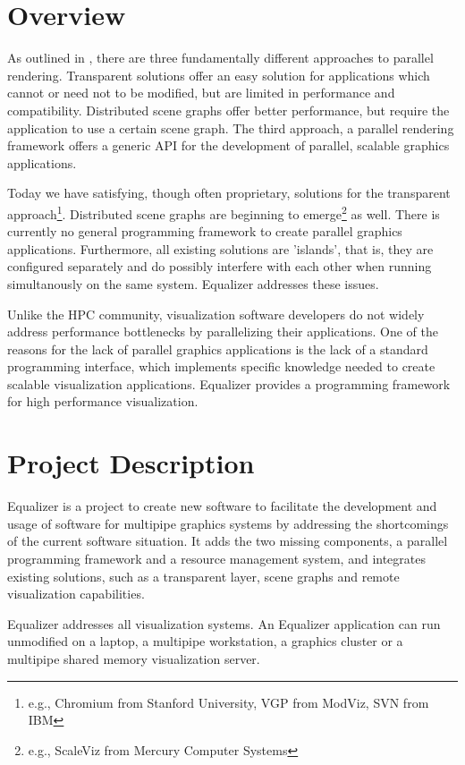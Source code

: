 \documentclass[10pt,a4paper]{scrartcl}
\begin{document}
\section{Overview}
As outlined in \cite{Analysis}, there are three fundamentally different
approaches to parallel rendering. Transparent solutions offer an easy
solution for applications which cannot or need not to be modified, but
are limited in performance and compatibility. Distributed
scene graphs offer better performance, but require the application
to use a certain scene graph. The third approach, a parallel rendering
framework offers a generic API for the development of parallel, scalable
graphics applications.

Today we have satisfying, though often proprietary, solutions for the
transparent approach\footnote{e.g., Chromium from Stanford University,
VGP from ModViz, SVN from IBM}. Distributed scene graphs are beginning
to emerge\footnote{e.g., ScaleViz from Mercury Computer Systems} as
well. There is currently no general programming framework to create
parallel graphics applications. Furthermore, all existing solutions are
'islands', that is, they are configured separately and do possibly
interfere with each other when running simultanously on the same
system. Equalizer addresses these issues.

Unlike the HPC community, visualization software developers do not
widely address performance bottlenecks by parallelizing
their applications. One of the reasons for the lack of parallel graphics
applications is the lack of a standard programming interface, which
implements specific knowledge needed to create scalable visualization
applications. Equalizer provides a programming framework for high
performance visualization.

\section{Project Description}

Equalizer is a project to create new software to facilitate the
development and usage of software for multipipe
graphics systems by addressing the shortcomings of the current
software situation. It adds the two missing components, a
parallel programming framework and a resource management system, and
integrates existing solutions, such as a transparent layer, scene graphs
and remote visualization capabilities.

Equalizer addresses all visualization systems. An Equalizer application
can run unmodified on a laptop, a multipipe workstation, a graphics
cluster or a multipipe shared memory visualization server.
\end{document}
